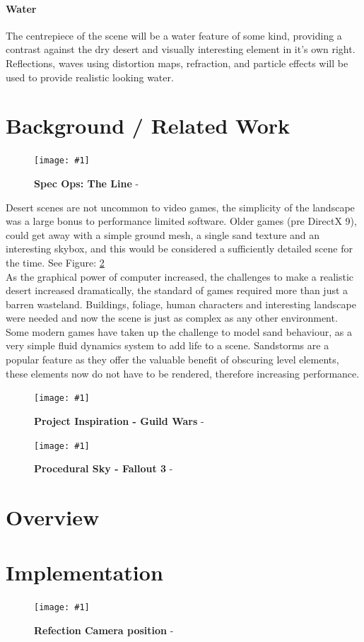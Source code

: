 \documentclass[conference]{acmsiggraph}
\newcommand{\figuremacroW}[4]{
	\begin{figure}[h] %
		\centering
		\texttt{[image: \#1]}
		\caption[#2]{\textbf{#2} - #3}
		\label{fig:#1}
	\end{figure}
}
\begin{document}
\paragraph{Water}
The centrepiece of the scene will be a water feature of some kind, providing a contrast against the dry desert and visually interesting element in it's own right. Reflections, waves using distortion maps, refraction, and particle effects will be used to provide realistic looking water. 

\section{Background / Related Work}
\figuremacroW
{specops}
{Spec Ops: The Line}
{\protect\cite{spec}}
{1.0}
Desert scenes are not uncommon to video games, the  simplicity of the landscape was a large bonus to performance limited software.
Older games (pre DirectX 9), could get away with a simple ground mesh, a single sand texture and an interesting skybox, and this would be considered a sufficiently detailed scene for the time. See Figure: \ref{fig:GuildWars}
\\
As the graphical power of computer increased, the challenges to make a realistic desert increased dramatically, the standard of games required more than just a barren wasteland. Buildings, foliage, human characters and interesting landscape were needed and now the scene is just as complex as any other environment.
Some modern games have taken up the challenge to model sand behaviour, as a very simple fluid dynamics system to add life to a scene. Sandstorms are a popular feature as they offer the valuable benefit of obscuring level elements, these elements now do not have to be rendered, therefore increasing performance.


\figuremacroW
{GuildWars}
{Project Inspiration - Guild Wars}
{\protect\cite{GuildWars}}
{1.0}

\figuremacroW
{fallout3}
{Procedural Sky - Fallout 3}
{\protect\cite{fallout3}}
{1.0}

\section{Overview}


\section{Implementation
}
\figuremacroW
{reflections}
{Refection Camera position}
{\protect\cite{Riemer}}
{1.0}
\end{document}
